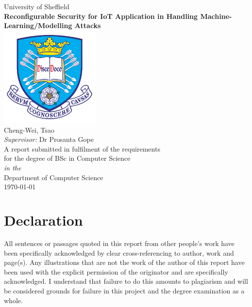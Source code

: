 \documentclass[11pt,oneside]{book}
\begin{document}
\frontmatter

\begin{titlepage}


\begin{center}
{\LARGE University of Sheffield}\\[1.5cm]
\linespread{1.2}\huge {\bfseries Reconfigurable Security for IoT Application in Handling Machine-Learning/Modelling Attacks}\\[1.5cm]
\linespread{1}
\includegraphics[width=5cm]{images/tuoslogo.png}\\[1cm]
{\Large Cheng-Wei, Tsao}\\[0.8cm]
{\large \emph{Supervisor:} Dr Prosanta Gope}\\[0.5cm]
\large A report submitted in fulfilment of the requirements\\ for the degree of BSc in Computer Science\\[0.3cm] 
\textit{in the}\\[0.3cm]
Department of Computer Science\\[2cm]
\today
\end{center}

\end{titlepage}


\newpage
\chapter*{\Large Declaration}


All sentences or passages quoted in this report from other people's work have been specifically acknowledged by clear cross-referencing to author, work and page(s). Any illustrations that are not the work of the author of this report have been used with the explicit permission of the originator and are specifically acknowledged. I understand that failure to do this amounts to plagiarism and will be considered grounds for failure in this project and the degree examination as a whole.\\[1cm]
\end{document}
